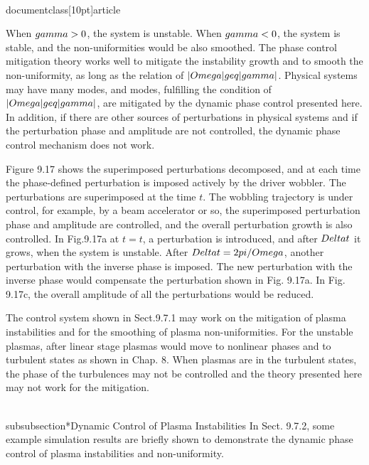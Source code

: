 \\documentclass[10pt]{article}
\begin{document}
{{{{{{When $\\gamma>0$, the system is unstable. When $\\gamma<0$, the system is stable, and the non-uniformities would be also smoothed. The phase control mitigation theory works well to mitigate the instability growth and to smooth the non-uniformity, as long as the relation of $|\\Omega| \\geq|\\gamma|$. Physical systems may have many modes, and modes, fulfilling the condition of $|\\Omega| \\geq|\\gamma|$, are mitigated by the dynamic phase control presented here. In addition, if there are other sources of perturbations in physical systems and if the perturbation phase and amplitude are not controlled, the dynamic phase control mechanism does not work.

Figure 9.17 shows the superimposed perturbations decomposed, and at each time the phase-defined perturbation is imposed actively by the driver wobbler. The perturbations are superimposed at the time $t$. The wobbling trajectory is under control, for example, by a beam accelerator or so, the superimposed perturbation phase and amplitude are controlled, and the overall perturbation growth is also controlled. In Fig.9.17a at $t=t$, a perturbation is introduced, and after $\\Delta t$ it grows, when the system is unstable. After $\\Delta t=2 \\pi / \\Omega$, another perturbation with the inverse phase is imposed. The new perturbation with the inverse phase would compensate the perturbation shown in Fig. 9.17a. In Fig. 9.17c, the overall amplitude of all the perturbations would be reduced.

The control system shown in Sect.9.7.1 may work on the mitigation of plasma instabilities and for the smoothing of plasma non-uniformities. For the unstable plasmas, after linear stage plasmas would move to nonlinear phases and to turbulent states as shown in Chap. 8. When plasmas are in the turbulent states, the phase of the turbulences may not be controlled and the theory presented here may not work for the mitigation.

\\subsubsection*{Dynamic Control of Plasma Instabilities}
In Sect. 9.7.2, some example simulation results are briefly shown to demonstrate the dynamic phase control of plasma instabilities and non-uniformity.

}}}}}}
\end{document}
